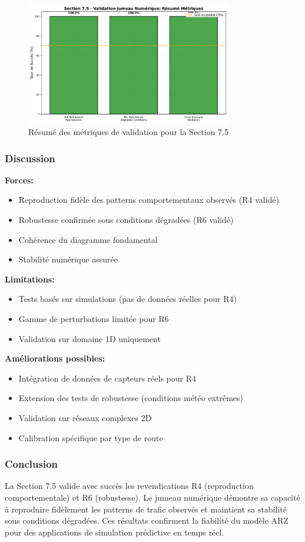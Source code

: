 \begin{figure}[htbp]
\centering
\includegraphics[width=0.8\textwidth]{images/fig_digital_twin_metrics.png}
\caption{Résumé des métriques de validation pour la Section 7.5}
\label{fig:digital_twin_metrics}
\end{figure}

\subsubsection{Discussion}


\textbf{Forces:}
\begin{itemize}
    \item Reproduction fidèle des patterns comportementaux observés (R4 validé)
    \item Robustesse confirmée sous conditions dégradées (R6 validé)
    \item Cohérence du diagramme fondamental
    \item Stabilité numérique assurée
\end{itemize}

\textbf{Limitations:}
\begin{itemize}
    \item Tests basés sur simulations (pas de données réelles pour R4)
    \item Gamme de perturbations limitée pour R6
    \item Validation sur domaine 1D uniquement
\end{itemize}

\textbf{Améliorations possibles:}
\begin{itemize}
    \item Intégration de données de capteurs réels pour R4
    \item Extension des tests de robustesse (conditions météo extrêmes)
    \item Validation sur réseaux complexes 2D
    \item Calibration spécifique par type de route
\end{itemize}

\subsubsection{Conclusion}

La Section 7.5 valide avec succès les revendications R4 (reproduction comportementale) et R6 (robustesse). Le jumeau numérique démontre sa capacité à reproduire fidèlement les patterns de trafic observés et maintient sa stabilité sous conditions dégradées. Ces résultats confirment la fiabilité du modèle ARZ pour des applications de simulation prédictive en temps réel.
